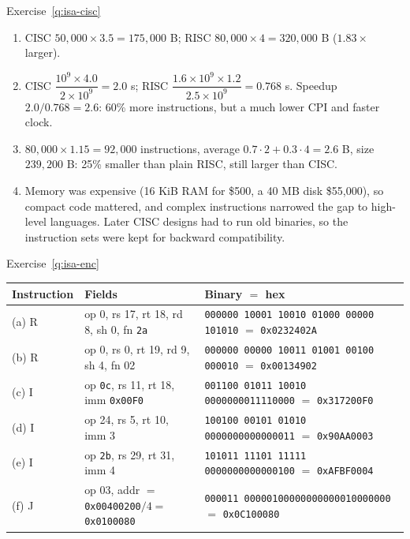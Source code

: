 \begin{noot}{Exercise~\ref{q:isa-cisc}}
\begin{enumerate}[label=(\alph*),leftmargin=*]
  \item CISC $50{,}000\times3.5=175{,}000$ B; RISC $80{,}000\times4=320{,}000$ B
  ($1.83\times$ larger).
  \item CISC $\dfrac{10^9\times4.0}{2\times10^9}=2.0$ s; RISC
  $\dfrac{1.6\times10^9\times1.2}{2.5\times10^9}=0.768$ s. Speedup
  $2.0/0.768=2.6$: 60\% more instructions, but a much lower CPI and faster clock.
  \item $80{,}000\times1.15=92{,}000$ instructions, average
  $0.7\cdot2+0.3\cdot4=2.6$ B, size $239{,}200$ B: 25\% smaller than plain RISC,
  still larger than CISC.
  \item Memory was expensive (16 KiB RAM for \$500, a 40 MB disk \$55{,}000),
  so compact code mattered, and complex instructions narrowed the gap to
  high-level languages. Later CISC designs had to run old binaries, so the
  instruction sets were kept for backward compatibility.
\end{enumerate}
\end{noot}

\begin{noot}{Exercise~\ref{q:isa-enc}}
\begin{center}
\footnotesize
\setlength{\tabcolsep}{3pt}
\begin{tabular}{@{}lp{4.1cm}l@{}}
\toprule
Instruction & Fields & Binary $=$ hex \\
\midrule
(a) R & op 0, rs 17, rt 18, rd 8, sh 0, fn \texttt{2a} &
\texttt{000000 10001 10010 01000 00000 101010} $=$ \texttt{0x0232402A} \\
(b) R & op 0, rs 0, rt 19, rd 9, sh 4, fn 02 &
\texttt{000000 00000 10011 01001 00100 000010} $=$ \texttt{0x00134902} \\
(c) I & op \texttt{0c}, rs 11, rt 18, imm \texttt{0x00F0} &
\texttt{001100 01011 10010 0000000011110000} $=$ \texttt{0x317200F0} \\
(d) I & op 24, rs 5, rt 10, imm 3 &
\texttt{100100 00101 01010 0000000000000011} $=$ \texttt{0x90AA0003} \\
(e) I & op \texttt{2b}, rs 29, rt 31, imm 4 &
\texttt{101011 11101 11111 0000000000000100} $=$ \texttt{0xAFBF0004} \\
(f) J & op 03, addr $=$ \texttt{0x00400200}$/4=$ \texttt{0x0100080} &
\texttt{000011 00000100000000000010000000} $=$ \texttt{0x0C100080} \\
\bottomrule
\end{tabular}
\end{center}
\end{noot}


